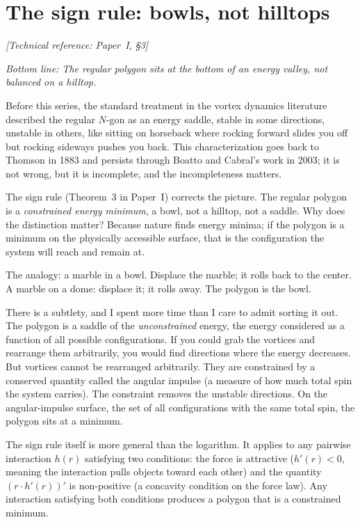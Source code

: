\section{The sign rule: bowls, not hilltops}
\noindent\textit{[Technical reference: Paper~I, \S3]}

\medskip

\noindent\textit{Bottom line: The regular polygon sits at the bottom
of an energy valley, not balanced on a hilltop.}

\medskip

Before this series, the standard treatment in the vortex dynamics
literature described the regular $N$-gon as an energy saddle, stable
in some directions, unstable in others, like sitting on horseback
where rocking forward slides you off but rocking sideways pushes you
back. This characterization goes back to Thomson in 1883 and persists
through Boatto and Cabral's work in 2003; it is not wrong, but it is
incomplete, and the incompleteness matters.

The sign rule (Theorem~3 in Paper~I) corrects the picture. The
regular polygon is a \emph{constrained energy minimum}, a bowl, not a
hilltop, not a saddle. Why does the distinction matter? Because nature
finds energy minima; if the polygon is a minimum on the physically
accessible surface, that is the configuration the system will reach and
remain at.

The analogy: a marble in a bowl. Displace the marble; it rolls back
to the center. A marble on a dome: displace it; it rolls away. The
polygon is the bowl.

There is a subtlety, and I spent more time than I care to admit
sorting it out. The polygon is a saddle of the \emph{unconstrained}
energy, the energy considered as a function of all possible
configurations. If you could grab the vortices and rearrange them
arbitrarily, you would find directions
where the energy decreases. But vortices cannot be rearranged
arbitrarily. They are constrained by a conserved quantity called the
angular impulse (a measure of how much total spin the system carries).
The constraint removes the unstable directions. On the
angular-impulse surface, the set of all configurations with the same
total spin, the polygon sits at a minimum.

The sign rule itself is more general than the logarithm. It applies to
any pairwise interaction $h(r)$ satisfying two conditions: the force
is attractive ($h'(r) < 0$, meaning the interaction pulls objects
toward each other) and the quantity $(r \cdot h'(r))'$ is
non-positive (a concavity condition on the force law). Any interaction
satisfying both conditions produces a polygon that is a constrained
minimum.

